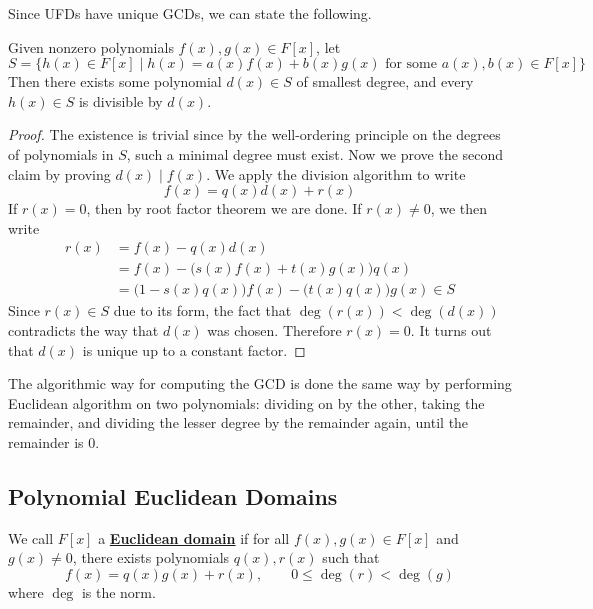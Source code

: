   Since UFDs have unique GCDs, we can state the following. 

  \begin{theorem}
    \label{thm:gcd-of-two-polynomials-in-a-ufd-exist}
    Given nonzero polynomials $f(x), g(x) \in F[x]$, let 
    \begin{equation}
      S = \{h(x) \in F[x] \mid h(x) = a(x) f(x) + b(x) g(x) \text{ for some } a(x), b(x) \in F[x] \}
    \end{equation} 
    Then there exists some polynomial $d(x) \in S$ of smallest degree, and every $h(x) \in S$ is divisible by $d(x)$. 
  \end{theorem}
  \begin{proof}
    The existence is trivial since by the well-ordering principle on the degrees of polynomials in $S$, such a minimal degree must exist. Now we prove the second claim by proving $d(x) \mid f(x)$. We apply the division algorithm to write 
    \begin{equation}
      f(x) = q(x) d(x) + r(x)
    \end{equation}
    If $r(x) = 0$, then by root factor theorem we are done. If $r(x) \neq 0$, we then write 
    \begin{align}
      r(x) & = f(x) - q(x) d(x) \\ 
           & = f(x) - \big( s(x) f(x) + t(x) g(x) \big) q(x) \\ 
           & = \big( 1 - s(x) q(x) \big) f(x) - \big( t(x) q(x) \big) g(x) \in S
    \end{align}
    Since $r(x) \in S$ due to its form, the fact that $\deg(r(x)) < \deg(d(x))$ contradicts the way that $d(x)$ was chosen. Therefore $r(x) = 0$. It turns out that $d(x)$ is unique up to a constant factor. 
  \end{proof}

  The algorithmic way for computing the GCD is done the same way by performing Euclidean algorithm on two polynomials: dividing on by the other, taking the remainder, and dividing the lesser degree by the remainder again, until the remainder is $0$. 

\subsection{Polynomial Euclidean Domains}

  \begin{definition}
    \label{def:polynomial-euclidean-domains}
    We call $F[x]$ a \textbf{\hyperref[def:euclidean-domain]{Euclidean domain}} if for all $f(x), g(x) \in F[x]$ and $g(x) \neq 0$, there exists polynomials $q(x), r(x)$ such that 
    \begin{equation}
      f(x) = q(x) g(x) + r(x), \qquad 0 \leq \deg(r) < \deg(g)
    \end{equation}
    where $\deg$ is the norm.
  \end{definition}


